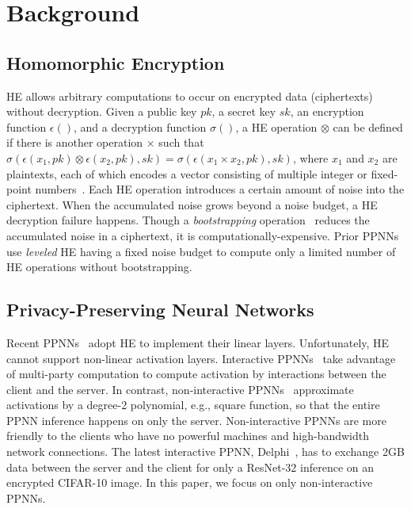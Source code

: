 \documentclass{article}
\begin{document}
	
\section{Background}
\label{s:back}

\subsection{Homomorphic Encryption}
HE allows arbitrary computations to occur on encrypted data (ciphertexts) without decryption. Given a public key $pk$, a secret key $sk$, an encryption function $\epsilon ()$, and a decryption function $\sigma ()$, a HE operation $\otimes$ can be defined if there is another operation $\times$ such that $\sigma(\epsilon(x_1, pk)\otimes\epsilon(x_2, pk), sk) = \sigma(\epsilon(x_1\times x_2, pk), sk)$, where $x_1$ and $x_2$ are plaintexts, each of which encodes a vector consisting of multiple integer or fixed-point numbers~\cite{dathathri:2019PLDI, Dathathri:PLDI20:EVA}. Each HE operation introduces a certain amount of noise into the ciphertext. When the accumulated noise grows beyond a noise budget, a HE decryption failure happens. Though a \textit{bootstrapping} operation~\cite{Gentry:HE2009} reduces the accumulated noise in a ciphertext, it is computationally-expensive. Prior PPNNs use \textit{leveled} HE having a fixed noise budget to compute only a limited number of HE operations without bootstrapping.
	
	
	
\subsection{Privacy-Preserving Neural Networks}
\label{s:ppnn_o}

Recent PPNNs~\cite{GAZELLE:USENIX18,mishra2020delphi,Brutzkus:ICML2019,Gilad-Bachrach:ICML2016,dathathri:2019PLDI,Dathathri:PLDI20:EVA} adopt HE to implement their linear layers. Unfortunately, HE cannot support non-linear activation layers. Interactive PPNNs~\cite{GAZELLE:USENIX18,mishra2020delphi} take advantage of multi-party computation to compute activation by interactions between the client and the server. In contrast, non-interactive PPNNs~\cite{Brutzkus:ICML2019,Gilad-Bachrach:ICML2016,dathathri:2019PLDI,Dathathri:PLDI20:EVA} approximate activations by a degree-2 polynomial, e.g., square function, so that the entire PPNN inference happens on only the server. Non-interactive PPNNs are more friendly to the clients who have no powerful machines and high-bandwidth network connections. The latest interactive PPNN, Delphi~\cite{mishra2020delphi}, has to exchange 2GB data between the server and the client for only a ResNet-32 inference on an encrypted CIFAR-10 image. In this paper, we focus on only non-interactive PPNNs. 
\end{document}
